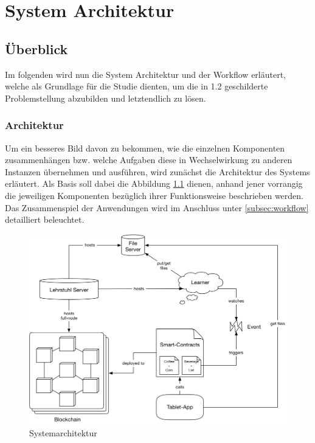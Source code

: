 \chapter{System Architektur}
\label{kap:Kapitel03}

\section{Überblick}
Im folgenden wird nun die System Architektur und der Workflow erläutert, welche als Grundlage für die Studie dienten, um die in 1.2 geschilderte Problemstellung abzubilden und letztendlich zu lösen.

\subsection{Architektur}
\label{subsec:architecture}
Um ein besseres Bild davon zu bekommen, wie die einzelnen Komponenten
zusammenhängen bzw. welche Aufgaben diese in Wechselwirkung zu anderen Instanzen übernehmen und ausführen, wird zunächst die Architektur des Systems erläutert. Als Basis soll dabei die Abbildung \ref{img:sysarc} dienen, anhand jener vorrangig die jeweiligen Komponenten bezüglich ihrer Funktionsweise beschrieben werden. Das Zusammenspiel der Anwendungen wird im Anschluss unter \ref{subsec:workflow} detailliert beleuchtet.

\clearpage
\newpage

\begin{figure}[th!]
	\centering
	\includegraphics[width=.99\columnwidth]{./Abbildungen/Kapitel_03/system_architecture.png}
	\caption{Systemarchitektur}
	\label{img:sysarc}
\end{figure}
\FloatBarrier

